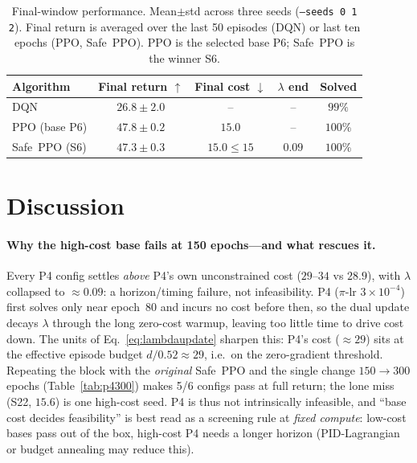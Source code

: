\documentclass{article}
\newcommand{\eqnref}[1]{Eq.~\eqref{#1}}
\newcommand{\tabref}[1]{Table~\ref{#1}}
\begin{document}
\begin{table}[t]
  \centering
  \caption{Final-window performance. Mean$\pm$std across three seeds (\texttt{--seeds 0 1 2}). Final
  return is averaged over the last 50 episodes (DQN) or last ten epochs (PPO, Safe~PPO). PPO is the
  selected base P6; Safe~PPO is the winner S6.}
  \label{tab:final}
  \begin{tabular}{lcccc}
    \toprule
    Algorithm & Final return $\uparrow$ & Final cost $\downarrow$ & $\lambda$ end & Solved \\
    \midrule
    DQN              & $26.8 \pm 2.0$ & --            & --              & $99\%$ \\
    PPO (base P6)    & $\mathbf{47.8 \pm 0.2}$ & $15.0$        & --              & $100\%$ \\
    Safe~PPO (S6)    & $47.3 \pm 0.3$ & $15.0 \le 15$ & $0.09$          & $100\%$ \\
    \bottomrule
  \end{tabular}
\end{table}


\section{Discussion}
\label{sec:discussion}

\paragraph{Why the high-cost base fails at 150 epochs---and what rescues it.}
Every P4 config settles \emph{above} P4's own unconstrained cost ($29$--$34$ vs $28.9$), with $\lambda$ collapsed to ${\approx}0.09$: a horizon/timing failure, not infeasibility. P4 ($\pi$-lr $3\times10^{-4}$) first solves only near epoch~80 and incurs no cost before then, so the dual update decays $\lambda$ through the long zero-cost warmup, leaving too little time to drive cost down. The units of \eqnref{eq:lambdaupdate} sharpen this: P4's cost ($\approx 29$) sits at the effective episode budget $d/0.52 \approx 29$, i.e.\ on the zero-gradient threshold. Repeating the block with the \emph{original} Safe~PPO and the single change $150\!\to\!300$ epochs (\tabref{tab:p4300}) makes 5/6 configs pass at full return; the lone miss (S22, $15.6$) is one high-cost seed. P4 is thus not intrinsically infeasible, and ``base cost decides feasibility'' is best read as a screening rule at \emph{fixed compute}: low-cost bases pass out of the box, high-cost P4 needs a longer horizon (PID-Lagrangian or budget annealing may reduce this).
\end{document}
